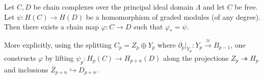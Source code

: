 Let $C, D$ be chain complexes over the principal ideal domain $\Lambda$ and let $C$ be free. Let $\psi : H(C) \rightarrow H(D)$ be a homomorphism of graded modules (of any degree). Then there exists a chain map $\varphi : C \rightarrow D$ such that $\varphi_* = \psi$.

More explicitly, using the splitting $C_p = Z_p \oplus Y_p$ where $\partial_p|_{Y_p} : Y_p \xrightarrow{\cong} B_{p-1}$, one constructs $\varphi$ by lifting $\psi_p : H_p(C) \rightarrow H_{p+n}(D)$ along the projections $Z_p \twoheadrightarrow H_p$ and inclusions $\bar{Z}_{p+n} \hookrightarrow D_{p+n}$.
